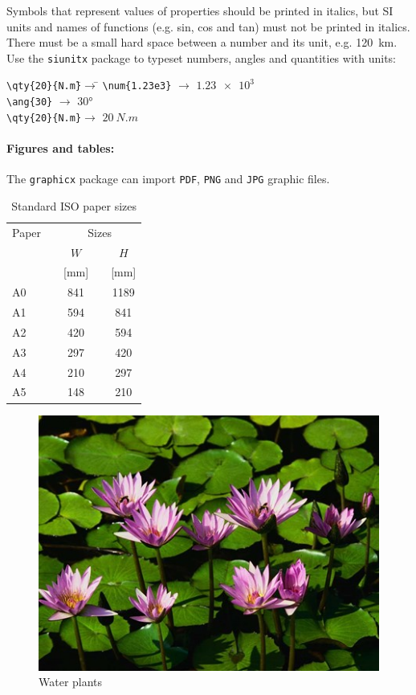 Symbols that represent values of properties should be printed in italics, but SI units and names of functions (e.g. sin, cos and tan) must not be printed in italics. There must be a small hard space between a number and its unit, e.g. \qty{120}{km}. Use the \texttt{siunitx} package to typeset numbers, angles and quantities with units:
\begin{tabbing}
\hspace*{\parindent}\=\verb|\qty{20}{N.m}|\quad\=$\rightarrow$\quad\=\kill
    \>\verb|\num{1.23e3}| \>$\rightarrow$\> $\num{1.23e3}$ \\
    \>\verb|\ang{30}|     \>$\rightarrow$\> $\ang{30}$ \\
    \>\verb|\qty{20}{N.m}|\>$\rightarrow$\> $\qty{20}{N.m}$
\end{tabbing}

\paragraph{Figures and tables:}
The \texttt{graphicx} package can import \texttt{PDF}, \texttt{PNG} and \texttt{JPG} graphic files.

\begin{table}[htbp]
    \centering
    \caption{Standard ISO paper sizes}
    \label{tab:paper}
    \begin{tabular}{lcccc}
    \hline
        Paper\quad && \multicolumn{3}{c}{Sizes} \\
    \cline{2-5}
        &&  $W$      && $H$ \\
        && \small [mm] &&  \small [mm]   \\
    \cline{1-1}\cline{3-3}\cline{5-5}
        A0 && 841 && 1189 \\
        A1 && 594 &&  841 \\
        A2 && 420 &&  594 \\
        A3 && 297 &&  420 \\
        A4 && 210 &&  297 \\
        A5 && 148 &&  210 \\
    \hline
    \end{tabular}
\end{table}


\begin{figure}[htbp]
    \centering
    \includegraphics[scale=0.75]{figs/waterplants}
    \caption{Water plants}
    \label{fig:waterplant}
\end{figure}
